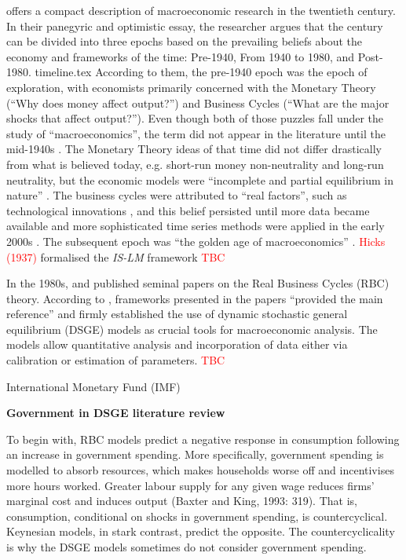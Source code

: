 \textcite{blanchard_2000_what} offers a compact description of macroeconomic research in the twentieth century. In their panegyric and optimistic essay, the researcher argues that the century can be divided into three epochs based on the prevailing beliefs about the economy and frameworks of the time: Pre-1940, From 1940 to 1980, and Post-1980. 
{timeline.tex}
According to them, the pre-1940 epoch was the epoch of exploration, with economists primarily concerned with the Monetary Theory (``Why does money affect output?'') and Business Cycles (``What are the major shocks that affect output?''). Even though both of those puzzles fall under the study of ``macroeconomics'', the term did not appear in the literature until the mid-1940s \parencite{blanchard_2000_what}. The Monetary Theory ideas of that time did not differ drastically from what is believed today, e.g. short-run money non-neutrality and long-run neutrality, but the economic models were ``incomplete and partial equilibrium in nature'' \parencite[1377]{blanchard_2000_what}. The business cycles were attributed to ``real factors'', such as technological innovations \parencite{blanchard_2000_what}, and this belief persisted until more data became available and more sophisticated time series methods were applied in the early 2000s \parencite[3]{jordigal_2015_monetary}. The subsequent epoch was ``the golden age of macroeconomics'' \parencite[1379]{blanchard_2000_what}. \textcolor{red}{Hicks (1937)} formalised the \textit{IS-LM} framework \textcolor{red}{TBC}

In the 1980s, \textcite{kydland_1982_time} and \textcite{prescott_1986_theory} published seminal papers on the Real Business Cycles (RBC) theory. According to \textcite[2]{jordigal_2015_monetary}, frameworks presented in the papers ``provided the main reference'' and firmly established the use of dynamic stochastic general equilibrium (DSGE) models as crucial tools for macroeconomic analysis. The models allow quantitative analysis and incorporation of data either via calibration or estimation of parameters. \textcolor{red}{TBC}

International Monetary Fund (IMF)

\textbf{Government in DSGE literature review}

To begin with, RBC models predict a negative response in consumption following an increase in government spending. More specifically, government spending is modelled to absorb resources, which makes households worse off and incentivises more hours worked. Greater labour supply for any given wage reduces firms' marginal cost and induces output (Baxter and King, 1993: 319). That is, consumption, conditional on shocks in government spending, is countercyclical. Keynesian models, in stark contrast, predict the opposite. The countercyclicality is why the DSGE models sometimes do not consider government spending. 

